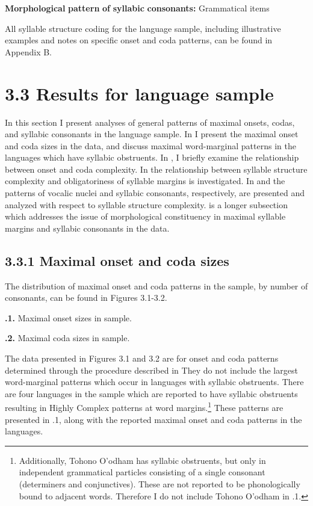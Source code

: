\textbf{Morphological} \textbf{pattern} \textbf{of} \textbf{syllabic} \textbf{consonants:} Grammatical items

\z

  All syllable structure coding for the language sample, including illustrative examples and notes on specific onset and coda patterns, can be found in Appendix B.

\section{3.3 Results for language sample}

  In this section I present analyses of general patterns of maximal onsets, codas, and syllabic consonants in the language sample. In  I present the maximal onset and coda sizes in the data, and discuss maximal word-marginal patterns in the languages which have syllabic obstruents. In , I briefly examine the relationship between onset and coda complexity. In  the relationship between syllable structure complexity and obligatoriness of syllable margins is investigated. In  and  the patterns of vocalic nuclei and syllabic consonants, respectively, are presented and analyzed with respect to syllable structure complexity.  is a longer subsection which addresses the issue of morphological constituency in maximal syllable margins and syllabic consonants in the data.

\subsection{3.3.1 Maximal onset and coda sizes}

  The distribution of maximal onset and coda patterns in the sample, by number of consonants, can be found in Figures 3.1-3.2.

\textbf{.1.} Maximal onset sizes in sample.

\textbf{.2.} Maximal coda sizes in sample.

  The data presented in Figures 3.1 and 3.2 are for onset and coda patterns determined through the procedure described in  They do not include the largest word-marginal patterns which occur in languages with syllabic obstruents. There are four languages in the sample which are reported to have syllabic obstruents resulting in Highly Complex patterns at word margins.\footnote{ \textrm{Additionally, Tohono O’odham has syllabic obstruents, but only in independent grammatical particles consisting of a single consonant (determiners and conjunctives). These are not reported to be phonologically bound to adjacent words. Therefore I do not include Tohono O’odham in .1.}} These patterns are presented in .1, along with the reported maximal onset and coda patterns in the languages.


